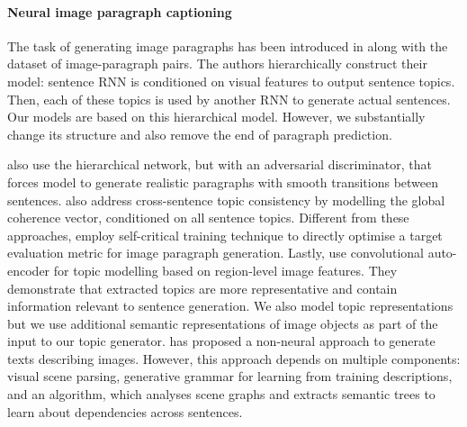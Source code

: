 \documentclass[11pt,a4paper]{article}
\begin{document}


\paragraph{Neural image paragraph captioning}
The task of generating image paragraphs has been introduced in \cite{krause2016hierarchical} along with the dataset of image-paragraph pairs.
The authors hierarchically construct their model: sentence RNN is conditioned on visual features to output sentence topics.
Then, each of these topics is used by another RNN to generate actual sentences.
Our models are based on this hierarchical model.
However, we substantially change its structure and also remove the end of paragraph prediction.


 also use the hierarchical network, but with an adversarial discriminator, that forces model to generate realistic paragraphs with smooth transitions between sentences.
 also address cross-sentence topic consistency by modelling the global coherence vector, conditioned on all sentence topics.
Different from these approaches,  employ self-critical training technique \cite{selfcritical2016} to directly optimise a target evaluation metric for image paragraph generation.
Lastly,  use convolutional auto-encoder for topic modelling based on region-level image features.
They demonstrate that extracted topics are more representative and contain information relevant to sentence generation.
We also model topic representations but we use additional semantic representations of image objects as part of the input to our topic generator.
 has proposed a non-neural approach to generate texts describing images.
However, this approach %
depends on multiple components: visual scene parsing, generative grammar for learning from training descriptions, and an algorithm, which analyses scene graphs and extracts semantic trees to learn about dependencies across sentences.
\end{document}
